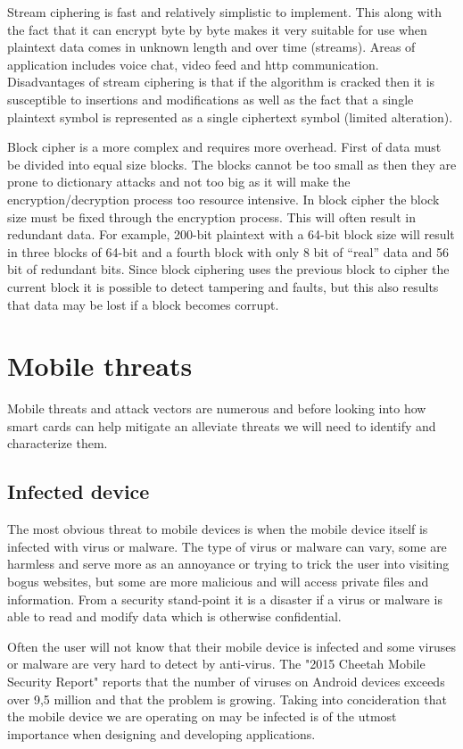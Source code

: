 Stream ciphering is fast and relatively simplistic to implement. This along with the fact that it can encrypt byte by byte makes it very suitable for use when plaintext data comes in  unknown length and over time (streams). Areas of application includes voice chat, video feed and http communication. Disadvantages of stream ciphering is that if the algorithm is cracked then it is susceptible to insertions and modifications as well as the fact that a single plaintext symbol is represented as a single ciphertext symbol (limited alteration).

Block cipher is a more complex and requires more overhead. First of data must be divided into equal size blocks. The blocks cannot be too small as then they are prone to dictionary attacks and not too big as it will make the encryption/decryption process too resource intensive. In block cipher the block size must be fixed through the encryption process. This will often result in redundant data. For example, 200-bit plaintext with a 64-bit block size will result in three blocks of 64-bit and a fourth block with only 8 bit of ``real'' data and 56 bit of redundant bits. Since block ciphering uses the previous block to cipher the current block it is possible to detect tampering and faults, but this also results that data may be lost if a block becomes corrupt.


\section{Mobile threats}
Mobile threats and attack vectors are numerous and before looking into how smart cards can help mitigate an alleviate threats we will need to identify and characterize them.
\subsection{Infected device}
The most obvious threat to mobile devices is when the mobile device itself is infected with virus or malware. The type of virus or malware can vary, some are harmless and serve more as an annoyance or trying to trick the user into visiting bogus websites, but some are more malicious and will access private files and information. From a security stand-point it is a disaster if a virus or malware is able to read and modify data which is otherwise confidential.

Often the user will not know that their mobile device is infected and some viruses or malware are very hard to detect by anti-virus. The "2015 Cheetah Mobile Security Report" \cite{cheetahSec} reports that the number of viruses on Android devices exceeds over 9,5 million and that the problem is growing. Taking into concideration that the mobile device we are operating on may be infected is of the utmost importance when designing and developing applications.

